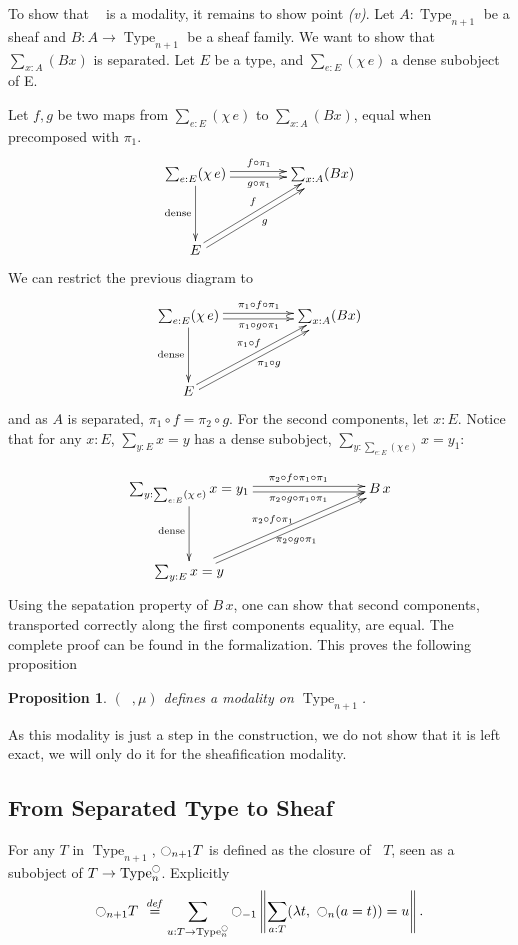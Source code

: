 \documentclass[conference]{IEEEtran}
\newtheorem{prop}[thm]{Proposition}
\newcommand \defeq {\overset{de\hspace{-0.2ex}f}{=}}
\newcommand{\mynote}[2]{
    \fbox{\bfseries\sffamily\scriptsize#1}
    {\small$\blacktriangleright$\textsf{\emph{#2}}$\blacktriangleleft$}~}
\newcommand\nt[1]{\mynote{NT}{#1}}
\DeclareMathOperator{\Type}{Type}
\newcommand{\modal}{\ensuremath{\ocircle}}
\newcommand \separated {\mathop{\square_{n+1}} }
\begin{document}
To show that $\separated$ is a modality, it remains to show point {\it (v)}. Let $A:\Type_{n+1}$ be a sheaf and $B:A \to \Type_{n+1}$ be
a sheaf family. We want to show that $\sum_{x:A} (Bx)$ is
separated. Let $E$ be a type, and $\sum_{e:E} (\chi\,e)$ a dense
subobject of E.

Let $f,g$ be two maps from $\sum_{e:E} (\chi\,e)$ to $\sum_{x:A}
(Bx)$, equal when precomposed with $\pi_1$.
$$\xymatrix @R=4em @C=4em{
  \sum_{e:E} (\chi\, e) \ar@<-2pt>[r]_{g\circ\pi_1} \ar@<2pt>[r]^{f\circ \pi_1} \ar[d]_{\mathrm{dense}}& \sum_{x :A} (Bx) \\
  E \ar@<-2pt>[ru]_{g} \ar@<2pt>[ru]^{f}&
}$$
We can restrict the previous diagram to 
$$\xymatrix @R=4em @C=5em{
  \sum_{e:E} (\chi\, e) \ar@<-2pt>[r]_{\pi_1\circ g\circ\pi_1} \ar@<2pt>[r]^{\pi_1\circ f\circ \pi_1} \ar[d]_{\mathrm{dense}}& \sum_{x :A} (Bx) \\
  E \ar@<-2pt>[ru]_{\pi_1\circ g} \ar@<2pt>[ru]^{\pi_1\circ f}&
}$$
and as $A$ is separated, $\pi_1\circ f = \pi_2 \circ g$.
For the second components, let $x:E$. Notice that for any $x:E$,
$\sum_{y:E} x = y$ has a dense subobject, $\sum_{y:\sum_{e:E} (\chi\,
  e)} x=y_1$:

$$\xymatrix@C=8em@R=4em{
  \sum_{y:\sum_{e:E} (\chi\,
  e)} x=y_1 \ar@<2pt>[r]^{\qquad \pi_2\circ f\circ\pi_1\circ \pi_1}
\ar@<-2pt>[r]_{\qquad \pi_2\circ g\circ \pi_1\circ \pi_1}
\ar[d]_{\mathrm{dense}}& B\,x \\
  \sum_{y:E} x = y \ar@<2pt>[ur]^{\pi_2\circ f\circ \pi_1} \ar@<-2pt>[ur]_{\pi_2\circ g\circ \pi_1}&
}$$
Using the sepatation property of $B\,x$, one can show that second
components, transported correctly along the first components equality,
are equal. The complete proof can be found in the formalization.
This proves the following proposition
\begin{prop}\label{prop:sep-mod}
  $(\separated,\mu)$ defines a modality on $\Type_{n+1}$.
\end{prop}

As this modality is just a step in the construction, we do not show
that it is left exact, we will only do it for the sheafification modality.

\subsection{From Separated Type to Sheaf}
\label{ssec:separated-to-sheaf}

For any $T$ in $\Type_{n+1}$, 
$\modal_{n+1}T$ is defined as the closure of $\separated T$,
seen as a subobject of $T \to \Type_n^\modal$. 
%
Explicitly
$$
\modal_{n+1} T \ \defeq \sum_{u:T \to \Type_n^\modal} \modal_{-1}\left\| \sum_{a:T} 
            (\lambda t,~\modal_n (a=t)) = u\right\|.
$$
\end{document}
